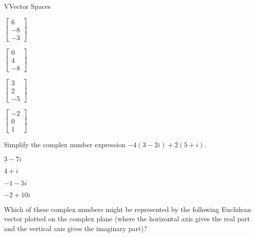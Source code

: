 \documentclass{article}[12pt]
\begin{document}
\begin{module}{V}{Vector Spaces}
\begin{readinessAssuranceTest}
  \begin{multicols}{4}
  \begin{readinessAssuranceTestChoices}
  \item \(
          \begin{bmatrix}
            6 \\ -8 \\ -3
          \end{bmatrix}
        \)
  \item \(
          \begin{bmatrix}
            0 \\ 4 \\ -8
          \end{bmatrix}
        \) %
  \item \(
          \begin{bmatrix}
            3 \\ 2 \\ -5
          \end{bmatrix}
        \)
  \item \(
          \begin{bmatrix}
            -2 \\ 0 \\ 1
          \end{bmatrix}
        \)
  \end{readinessAssuranceTestChoices}
  \end{multicols}

  \item Simplify the complex number expression
        \(-4(3-2i)+2(5+i)\).

  \begin{multicols}{4}
  \begin{readinessAssuranceTestChoices}
  \item \(3-7i\)
  \item \(4+i\)
  \item \(-1-5i\)
  \item \(-2+10i\) %
  \end{readinessAssuranceTestChoices}
  \end{multicols}

  \item Which of these complex numbers might be represented
        by the following Euclidean vector
        plotted on the complex plane (where the horizontal axis gives the
        real part and the vertical axis gives the imaginary part)?

        \begin{center}
        \end{center}


\end{readinessAssuranceTest}
\end{module}
\end{document}
